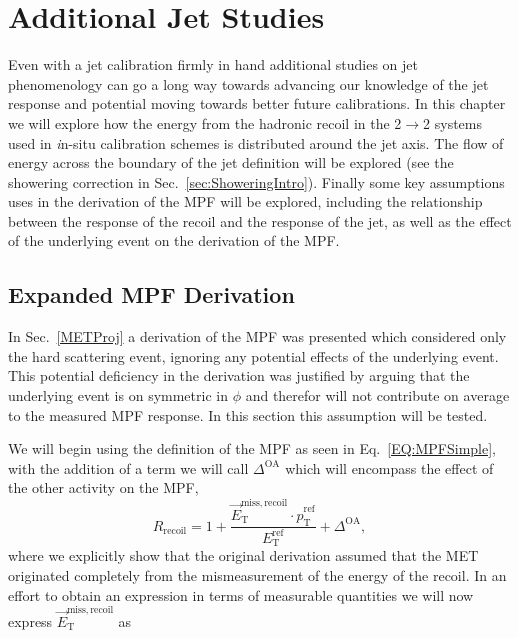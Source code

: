 \chapter{Additional Jet Studies}


Even with a jet calibration firmly in hand additional studies on jet phenomenology can go a long way towards advancing our knowledge of the jet response and potential moving towards better future calibrations.  
In this chapter we will explore how the energy from the hadronic recoil in the 2$\rightarrow$2 systems used in {\textit in-situ} calibration schemes is distributed around the jet axis.  
The flow of energy across the boundary of the jet definition will be explored (see the showering correction in Sec.~\ref{sec:ShoweringIntro}).  
Finally some key assumptions uses in the derivation of the MPF will be explored, including the relationship between the response of the recoil and the response of the jet, as well as the effect of the underlying event on the derivation of the MPF.  
 

\section{Expanded MPF Derivation}

In Sec.~\ref{METProj} a derivation of the MPF was presented which considered only the hard scattering event, ignoring any potential effects of the underlying event.  
This potential deficiency in the derivation was justified by arguing that the underlying event is on symmetric in $\phi$ and therefor will not contribute on average to the measured MPF response.  
In this section this assumption will be tested.  


We will begin using the definition of the MPF as seen in Eq.~\ref{EQ:MPFSimple}, with the addition of a term we will call $\Delta^{\mathrm{OA}}$ which will encompass the effect of the other activity on the MPF, 
\begin{equation}
  \label{Eq:MPFWithDelta}
  R_{\mathrm{recoil}}=1+\frac{\vec{E}_{\mathrm T}^{\mathrm{miss, recoil}}\cdot\hat{p}_{\mathrm T}^{\mathrm{ref}}}{E_{\mathrm T}^{\mathrm{ref}}} + \Delta^{\mathrm{OA}}, 
\end{equation}
\noindent
where we explicitly show that the original derivation assumed that the MET originated completely from the mismeasurement of the energy of the recoil.  
In an effort to obtain an expression in terms of measurable quantities we will now express $\vec{E}_{\mathrm T}^{\mathrm{miss, recoil}}$ as 

